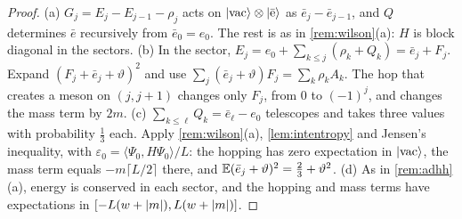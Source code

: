 \begin{proof}
(a) $G_j=E_j-E_{j-1}-\rho_j$ acts on $|\rm vac\rangle\otimes|\bar e\rangle$ as $\bar e_j-\bar e_{j-1}$, and $Q$ determines $\bar e$
recursively from $\bar e_0=e_0$.  The rest is as in \cref{rem:wilson}(a): $H$ is block diagonal in the sectors.
(b) In the sector, $E_j=e_0+\sum_{k\le j}(\rho_k+Q_k)=\bar e_j+F_j$.  Expand $(F_j+\bar e_j+\vartheta)^2$ and use
$\sum_j(\bar e_j+\vartheta)F_j=\sum_k\rho_kA_k$.  The hop that creates a meson on $(j,j+1)$ changes only $F_j$, from $0$
to $(-1)^j$, and changes the mass term by $2m$.  (c) $\sum_{k\le\ell}Q_k=\bar e_\ell-e_0$ telescopes and takes three values
with probability $\frac13$ each.  Apply \cref{rem:wilson}(a), \cref{lem:intentropy} and Jensen's inequality, with
$\varepsilon_0=\langle\Psi_0,H\Psi_0\rangle/L$: the hopping has zero expectation in $|\rm vac\rangle$, the mass term equals
$-m\lceil L/2\rceil$ there, and $\mathbb{E}(\bar e_j+\vartheta)^2=\frac23+\vartheta^2$.  (d) As in \cref{rem:adhh}(a), energy is
conserved in each sector, and the hopping and mass terms have expectations in $[-L(w+\left|m\right|),L(w+\left|m\right|)]$.
\end{proof}

